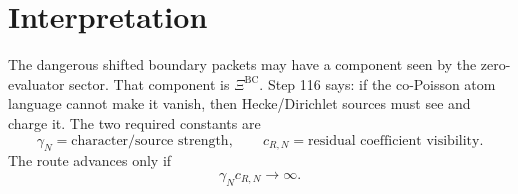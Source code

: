 \documentclass[11pt]{article}
\newcommand{\BC}{\mathrm{BC}}
\begin{document}
\section{Interpretation}
The dangerous shifted boundary packets may have a component seen by the zero-evaluator sector. That component is $\Xi^{\BC}$. Step 116 says: if the co-Poisson atom language cannot make it vanish, then Hecke/Dirichlet sources must see and charge it. The two required constants are
\[
\gamma_N=\text{character/source strength},\qquad c_{R,N}=\text{residual coefficient visibility}.
\]
The route advances only if
\[
\gamma_Nc_{R,N}\to\infty.
\]
\end{document}
